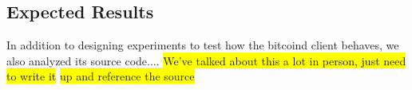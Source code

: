 \subsection{Expected Results}
In addition to designing experiments to test how the bitcoind client behaves, we also analyzed its source code....
\colorbox{yellow}{We've talked about this a lot in person, just need to write it} \colorbox{yellow}{up and reference the source}

